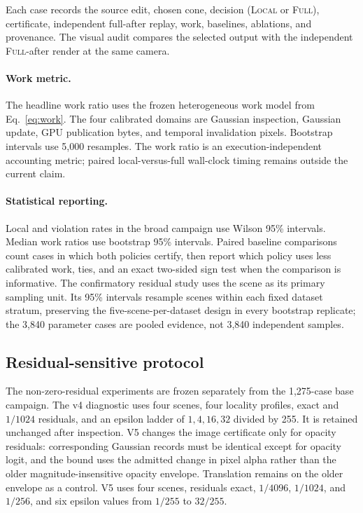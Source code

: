 \documentclass[acmtog,nonacm]{acmart}
\newcommand{\FULL}{\textsc{Full}}
\newcommand{\LOCAL}{\textsc{Local}}
\begin{document}
Each case records the source edit, chosen cone, decision (\LOCAL{} or \FULL{}), certificate, independent full-after replay, work, baselines, ablations, and provenance. The visual audit compares the selected output with the independent \FULL{}-after render at the same camera.

\paragraph{Work metric.}
The headline work ratio uses the frozen heterogeneous work model from Eq.~\ref{eq:work}. The four calibrated domains are Gaussian inspection, Gaussian update, GPU publication bytes, and temporal invalidation pixels. Bootstrap intervals use 5,000 resamples. The work ratio is an execution-independent accounting metric; paired local-versus-full wall-clock timing remains outside the current claim.

\paragraph{Statistical reporting.}
Local and violation rates in the broad campaign use Wilson 95\% intervals. Median work ratios use bootstrap 95\% intervals. Paired baseline comparisons count cases in which both policies certify, then report which policy uses less calibrated work, ties, and an exact two-sided sign test when the comparison is informative. The confirmatory residual study uses the scene as its primary sampling unit. Its 95\% intervals resample scenes within each fixed dataset stratum, preserving the five-scene-per-dataset design in every bootstrap replicate; the 3,840 parameter cases are pooled evidence, not 3,840 independent samples.

\subsection{Residual-sensitive protocol}
The non-zero-residual experiments are frozen separately from the 1,275-case base campaign. The v4 diagnostic uses four scenes, four locality profiles, exact and $1/1024$ residuals, and an epsilon ladder of $1,4,16,32$ divided by 255. It is retained unchanged after inspection. V5 changes the image certificate only for opacity residuals: corresponding Gaussian records must be identical except for opacity logit, and the bound uses the admitted change in pixel alpha rather than the older magnitude-insensitive opacity envelope. Translation remains on the older envelope as a control. V5 uses four scenes, residuals exact, $1/4096$, $1/1024$, and $1/256$, and six epsilon values from $1/255$ to $32/255$.
\end{document}
